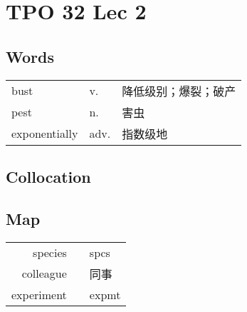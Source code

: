 \section{TPO 32 Lec 2}

\subsection{Words}

\begin{tabular}{lll}
    bust          & v.   & 降低级别；爆裂；破产 \\
    pest          & n.   & 害虫         \\
    exponentially & adv. & 指数级地       \\
\end{tabular}

\subsection{Collocation}

\subsection{Map}

\begin{tabular}{rc@{\quad$\to$\quad}l}
    species    &  & spcs  \\
    colleague  &  & 同事    \\
    experiment &  & expmt \\
\end{tabular}
